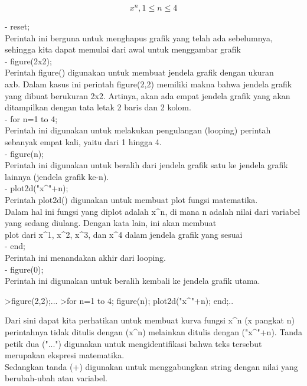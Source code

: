 \documentclass[a4paper,10pt]{article}
\begin{document}
\begin{eulernotebook}
\begin{eulercomment}
\begin{eulercomment}
\begin{eulercomment}
\end{eulercomment}
\begin{eulerformula}
\[
x^n,  1 \leq n \leq 4
\]
\end{eulerformula}
\begin{eulercomment}
- reset;\\
Perintah ini berguna untuk menghapus grafik yang telah ada sebelumnya,
sehingga kita dapat memulai dari awal untuk menggambar grafik\\
- figure(2x2);\\
Perintah figure() digunakan untuk membuat jendela grafik dengan ukuran\\
axb. Dalam kasus ini perintah figure(2,2) memiliki makna bahwa jendela
grafik yang dibuat berukuran 2x2. Artinya, akan ada empat jendela
grafik yang akan ditampilkan dengan tata letak 2 baris dan 2 kolom.\\
- for n=1 to 4;\\
Perintah ini digunakan untuk melakukan pengulangan (looping) perintah
sebanyak empat kali, yaitu dari 1 hingga 4.\\
- figure(n);\\
Perintah ini digunakan untuk beralih dari jendela grafik satu ke
jendela grafik lainnya (jendela grafik ke-n).\\
- plot2d("x\textasciicircum{}"+n);\\
Perintah plot2d() digunakan untuk membuat plot fungsi matematika.\\
Dalam hal ini fungsi yang diplot adalah x\textasciicircum{}n, di mana n adalah nilai
dari variabel yang sedang diulang. Dengan kata lain, ini akan membuat\\
plot dari x\textasciicircum{}1, x\textasciicircum{}2, x\textasciicircum{}3, dan x\textasciicircum{}4 dalam jendela grafik yang sesuai\\
- end;\\
Perintah ini menandakan akhir dari looping.\\
- figure(0);\\
Perintah ini digunakan untuk beralih kembali ke jendela grafik utama.
\end{eulercomment}
\begin{eulerprompt}
>figure(2,2);... 
>for n=1 to 4; figure(n); plot2d("x^"+n); end;..
\end{eulerprompt}
\begin{eulercomment}
Dari sini dapat kita perhatikan untuk membuat kurva fungsi x\textasciicircum{}n (x
pangkat n) perintahnya tidak ditulis dengan (x\textasciicircum{}n) melainkan ditulis
dengan ("x\textasciicircum{}"+n). Tanda petik dua ("...") digunakan untuk
mengidentifikasi bahwa teks tersebut merupakan ekspresi matematika.\\
Sedangkan tanda (+) digunakan untuk menggabungkan string dengan nilai
yang berubah-ubah atau variabel.


\end{eulercomment}
\end{eulercomment}
\end{eulercomment}
\end{eulernotebook}
\end{document}
